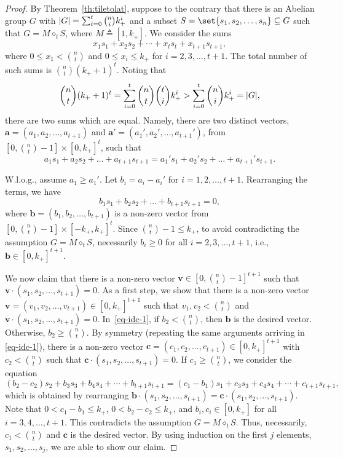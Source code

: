 \documentclass[sort&compress]{elsarticle}
\DeclarePairedDelimiter\abs{\lvert}{\rvert}
\renewcommand{\leq}{\leqslant}
\renewcommand{\geq}{\geqslant}
\newcommand{\vv}{\mathbf{v}}
\newcommand{\va}{\mathbf{a}}
\newcommand{\vb}{\mathbf{b}}
\newcommand{\vc}{\mathbf{c}}
\newcommand{\kp}{k_+}
\newcommand{\eqdef}{\triangleq}
\newcommand{\splt}{\diamond}
\begin{document}
\begin{proof}
  By Theorem~\ref{th:tiletolat}, suppose to the contrary that there is
  an Abelian group $G$ with $\abs{G}= \sum_{i=0}^t \binom{n}{i} \kp^i$ and
  a subset $S=\set{s_1,s_2,\ldots, s_n} \subseteq G$ such that
  $G=M\splt_t S$, where $M\eqdef[1,\kp]$. We consider the sums
  \[x_1s_1+x_2s_2+\cdots + x_t s_t+x_{t+1}s_{t+1},\]
  where $0\leq x_1 < \binom{n}{t}$ and $0\leq x_i \leq \kp$ for
  $i=2,3,\ldots, t+1$. The total number of such sums is $\binom{n}{t}
  (\kp+1)^t$.  Noting that
  \[ \binom{n}{t} (\kp+1)^t =  \sum_{i=0}^t  \binom{n}{t}  \binom{t}{i}  \kp^i    > \sum_{i=0}^t \binom{n}{i} \kp^i=\abs{G},\]
  there are two sums which are equal. Namely, there are two distinct
  vectors, $\va=(a_1,a_2,\ldots,a_{t+1})$ and $\va'=(a_1',a_2',\ldots,
  a_{t+1}')$, from $[0,\binom{n}{t}-1]\times [0, \kp]^{t}$, such that
  \[ a_1 s_1+a_2s_2+\ldots+a_{t+1} s_{t+1}=a_1' s_1+a_2's_2+\ldots+a_{t+1}'s_{t+1}.\]

  W.l.o.g., assume $a_1 \geq a_1'$.  Let $b_i=a_i-a_i'$ for
  $i=1,2,\ldots, t+1$. Rearranging the terms, we have
  \begin{equation}\label{eq-idc-1}
    b_1 s_1+b_2s_2+\ldots+b_{t+1} s_{t+1}=0,
  \end{equation}
  where $\vb=(b_1,b_2,\ldots, b_{t+1})$ is a non-zero vector from
  $[0,\binom{n}{t}-1]\times [-\kp,\kp]^t$. Since $\binom{n}{t}-1 \leq
  \kp$, to avoid contradicting the assumption $G=M\splt_t S$,
  necessarily $b_i\geq 0$ for all $i=2,3,\ldots,t+1$, i.e., $\vb \in
  [0, \kp]^{t+1}$.

  We now claim that there is a non-zero vector $\vv \in [0,
    \binom{n}{t}-1]^{t+1}$ such that $\vv\cdot (s_1,s_2,\ldots,
  s_{t+1})=0$. As a first step, we show that there is a non-zero vector
  $\vv=(v_1,v_2,\ldots, v_{t+1})\in [0, \kp]^{t+1}$ such that $v_1,v_2
  < \binom{n}{t}$ and $\vv\cdot (s_1,s_2,\ldots,
  s_{t+1})=0$. In~\eqref{eq-idc-1}, if $b_2 < \binom{n}{t}$, then
  $\vb$ is the desired vector. Otherwise, $b_2 \geq \binom{n}{t}$. By
  symmetry (repeating the same arguments arriving in
  \eqref{eq-idc-1}), there is a non-zero vector $\vc=(c_1,c_2,\ldots,
  c_{t+1}) \in [0, \kp]^{t+1}$ with $c_2 < \binom{n}{t}$ such that
  $\vc\cdot (s_1,s_2,\ldots, s_{t+1})=0$. If $c_1 \geq \binom{n}{t}$,
  we consider the equation
  \[  (b_2-c_2)s_2+ b_3s_3+b_4s_4+ \cdots + b_{t+1}s_{t+1}= (c_1-b_1)s_1+ c_3s_3+c_4s_4+ \cdots + c_{t+1}s_{t+1},\]
  which is obtained by rearranging $\vb \cdot (s_1,s_2,\ldots,
  s_{t+1}) = \vc \cdot (s_1,s_2,\ldots, s_{t+1}).$ Note that
  $0<c_1-b_1 \leq \kp$, $0<b_2-c_2\leq \kp$, and $b_i,c_i\in [0,\kp]$
  for all $i=3,4,\ldots,t+1$. This contradicts the assumption
  $G=M\splt_t S$. Thus, necessarily, $c_1 <\binom{n}{t}$ and $\vc$ is
  the desired vector.  By using induction on the first $j$ elements,
  $s_1,s_2,\ldots, s_j$, we are able to show our claim.



\end{proof}
\end{document}
